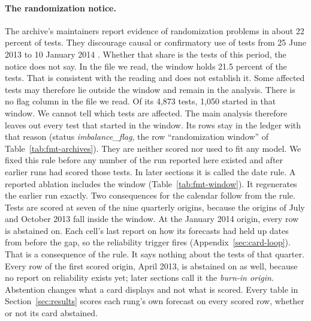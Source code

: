 \documentclass[sigconf,nonacm]{acmart}
\begin{document}
\paragraph{The randomization notice.}
The archive's maintainers report evidence of randomization problems in about 22 percent of tests. They discourage causal or confirmatory use of tests from 25 June 2013 to 10 January 2014 \cite{upworthy2024notice}. Whether that share is the tests of this period, the notice does not say. In the file we read, the window holds 21.5 percent of the tests. That is consistent with the reading and does not establish it. Some affected tests may therefore lie outside the window and remain in the analysis.
There is no flag column in the file we read. Of its 4,873 tests, 1,050 started in that window.
We cannot tell which tests are affected. The main analysis therefore leaves out every test that started in the window. Its rows stay in the ledger with that reason (status \emph{imbalance\_flag}, the row ``randomization window'' of Table~\ref{tab:fmt-archives}). They are neither scored nor used to fit any model. We fixed this rule before any number of the run reported here existed and after earlier runs had scored those tests. In later sections it is called the date rule. A reported ablation includes the window (Table~\ref{tab:fmt-window}). It regenerates the earlier run exactly.
Two consequences for the calendar follow from the rule. Tests are scored at seven of the nine quarterly origins, because the origins of July and October 2013 fall inside the window. At the January 2014 origin, every row is abstained on. Each cell's last report on how its forecasts had held up dates from before the gap, so the reliability trigger fires (Appendix~\ref{sec:card-loop}). That is a consequence of the rule. It says nothing about the tests of that quarter. Every row of the first scored origin, April 2013, is abstained on as well, because no report on reliability exists yet; later sections call it the \emph{burn-in origin}. Abstention changes what a card displays and not what is scored. Every table in Section~\ref{sec:results} scores each rung's own forecast on every scored row, whether or not its card abstained.
\end{document}
